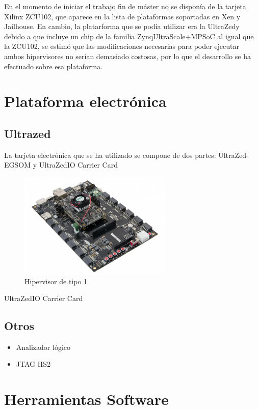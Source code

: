 En el momento de iniciar el trabajo fin de máster no se disponía de la tarjeta Xilinx ZCU102, que aparece en la lista de plataformas soportadas en Xen y Jailhouse. En cambio, la platarforma que se podía utilizar era la UltraZed\texttrademark y debido a que incluye un chip de la familia Zynq\textregistered UltraScale+\texttrademark MPSoC al igual que la ZCU102, se estimó que las modificaciones necesarias para poder ejecutar ambos hipervisores no serían demasiado costosas, por lo que el desarrollo se ha efectuado sobre esa plataforma.

\section{Plataforma electrónica}
\subsection{Ultrazed}
La tarjeta electrónica que se ha utilizado se compone de dos partes: UltraZed-EG\texttrademark SOM y UltraZed\texttrademark IO Carrier Card

\begin{figure}[h]
	\centering
	\includegraphics[width=0.65\textwidth]{recursos/ultrazed-eg-carrier.png}
	\caption{Hipervisor de tipo 1}
	\label{fig:ultrazed-eg-carrier}
\end{figure}

UltraZed\texttrademark IO Carrier Card

\subsection{Otros}

\begin{itemize}
  \item Analizador lógico
  \item JTAG HS2
\end{itemize}

\section{Herramientas Software}
